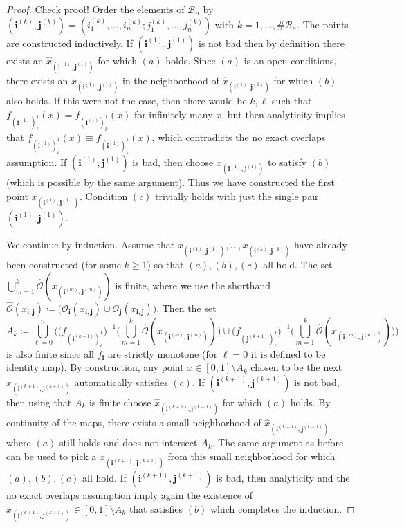 \documentclass[12pt,]{article}
\theoremstyle{definition}
\theoremstyle{remark}
\newcommand{\0}{\mathbf{0}}
\newcommand{\bi}{\mathbf{i}}
\newcommand{\bj}{\mathbf{j}}
\begin{document}
{\begin{proof}{\color{red}Check proof!}
Order the elements of $\mathcal{B}_n$ by $(\bi^{(k)},\bj^{(k)})=(i_1^{(k)},\ldots, i_n^{(k)};j_1^{(k)},\ldots,j_n^{(k)})$ with $k=1,\ldots,\#\mathcal{B}_n$. The points are constructed inductively. If $(\bi^{(1)},\bj^{(1)})$ is not bad then by definition there exists an $\hat x_{(\bi^{(1)},\bj^{(1)})}$ for which $(a)$ holds. Since $(a)$ is an open conditions, there exists an $x_{(\bi^{(1)},\bj^{(1)})}$ in the neighborhood of $\hat x_{(\bi^{(1)},\bj^{(1)})}$ for which $(b)$ also holds. If this were not the case, then there would be $k,\ell$ such that $f_{(\bi^{(1)})_{\ell}^1}(x)=f_{(\bi^{(1)})_{k}^1}(x)$ for infinitely many $x$, but then analyticity implies that $f_{(\bi^{(1)})_{\ell}^1}(x)\equiv f_{(\bi^{(1)})_{k}^1}(x)$, which contradicts the no exact overlaps assumption. If $(\bi^{(1)},\bj^{(1)})$ is bad, then choose $x_{(\bi^{(1)},\bj^{(1)})}$ to satisfy $(b)$ (which is possible by the same argument). Thus we have constructed the first point $x_{(\bi^{(1)},\bj^{(1)})}$. Condition $(c)$ trivially holds with just the single pair $(\bi^{(1)},\bj^{(1)})$. 

We continue by induction. Assume that $x_{(\bi^{(1)},\bj^{(1)})},\ldots,x_{(\bi^{(k)},\bj^{(k)})}$ have already been constructed (for some $k\geq 1$) so that $(a),(b),(c)$ all hold. The set $\bigcup_{m=1}^k \widehat{\mathcal{O}}(x_{(\bi^{(m)},\bj^{(m)})})$ is finite, where we use the shorthand  $\widehat{\mathcal{O}}(x_{\bi,\bj})\coloneqq\big(\mathcal{O}_{\bi}(x_{\bi,\bj})\cup \mathcal{O}_{\bj}(x_{\bi,\bj})\big)$. Then the set
\begin{equation*}
A_k\coloneqq \bigcup_{\ell=0}^n \bigg( \big(f_{(\bi^{(k+1)})_{\ell}^1}\big)^{-1} \Big( \bigcup_{m=1}^k \widehat{\mathcal{O}}(x_{(\bi^{(m)},\bj^{(m)})}) \Big) \cup \big(f_{(\bj^{(k+1)})_{\ell}^1}\big)^{-1} \Big( \bigcup_{m=1}^k \widehat{\mathcal{O}}(x_{(\bi^{(m)},\bj^{(m)})}) \Big) \bigg)
\end{equation*}
is also finite since all $f_{\bi}$ are strictly monotone (for $\ell=0$ it is defined to be identity map). By construction, any point $x\in[0,1]\setminus A_k$ chosen to be the next $x_{(\bi^{(k+1)},\bj^{(k+1)})}$ automatically satisfies $(c)$. If $(\bi^{(k+1)},\bj^{(k+1)})$ is not bad, then using that $A_k$ is finite choose $\hat x_{(\bi^{(k+1)},\bj^{(k+1)})}$ for which $(a)$ holds. By continuity of the maps, there exists a small neighborhood of $\hat x_{(\bi^{(k+1)},\bj^{(k+1)})}$ where $(a)$ still holds and does not intersect $A_k$. The same argument as before can be used to pick a $x_{(\bi^{(k+1)},\bj^{(k+1)})}$ from this small neighborhood for which $(a),(b),(c)$ all hold. If $(\bi^{(k+1)},\bj^{(k+1)})$ is bad, then analyticity and the no exact overlaps assumption imply again the existence of $x_{(\bi^{(k+1)},\bj^{(k+1)})}\in[0,1]\setminus A_k$ that satisfies $(b)$ which completes the induction. 
\end{proof}

}
\end{document}
